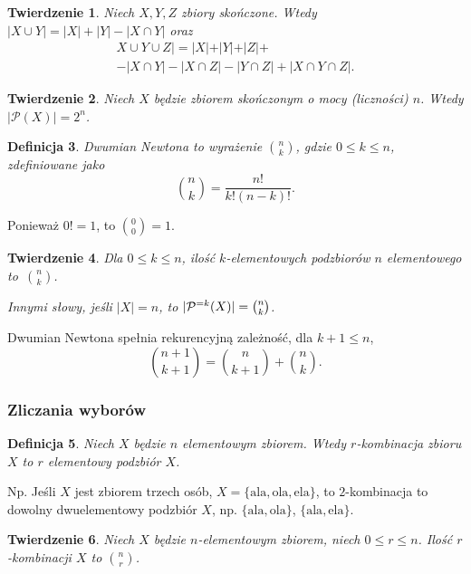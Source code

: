 \documentclass[12pt]{article}
\newcommand{\cP}{\mathcal{P}}
\newtheorem{thm}{Twierdzenie}
\newtheorem{dfn}[thm]{Definicja}
\newcommand{\ala}{\textrm{ala}}
\newcommand{\ela}{\textrm{ela}}
\newcommand{\ola}{\textrm{ola}}
\begin{document}
\begin{thm}
	Niech $X,Y, Z$ zbiory skończone. Wtedy 
		$|X\cup Y|=|X|+|Y|-|X\cap Y|$ oraz
		 \begin{multline*}
		 	X\cup Y\cup Z|= |X|+|Y|+|Z|+ \\
		 	- |X\cap Y| - |X\cap Z| - |Y\cap Z| + |X\cap Y\cap Z|.
		 \end{multline*} 
\end{thm}

\begin{thm}
	Niech $X$ będzie zbiorem skończonym o mocy (liczności) $n$. 
	Wtedy $|\cP(X)|=2^n$.
\end{thm}

\begin{dfn}
	Dwumian Newtona to wyrażenie $\binom{n}{k}$, gdzie $0\leq k\leq n$, zdefiniowane jako
	\[
	\binom{n}{k}=\frac{n!}{k!(n-k)!}.
	\]
\end{dfn}
Ponieważ $0!=1$, to $\binom{0}{0}=1$.

\begin{thm}
	Dla $0\leq k \leq n$, ilość $k$-elementowych podzbiorów
	$n$ elementowego to~$\binom{n}{k}$. 
	
	Innymi słowy, jeśli $|X|=n$, 
	to $|\cP\sp{=k}(X)|=\binom{n}{k}$.
\end{thm}

Dwumian Newtona spełnia rekurencyjną zależność,
dla $k+1\leq n$, 
\[
\binom{n+1}{k+1} = \binom{n}{k+1} + \binom{n}{k}.  
\]

\subsubsection{Zliczania wyborów}


\begin{dfn}
	Niech $X$ będzie $n$ elementowym zbiorem.
	Wtedy $r$-kombinacja  zbioru $X$ to $r$ elementowy podzbiór $X$.
\end{dfn} 

Np. Jeśli $X$ jest zbiorem trzech osób,
$X=\{\ala, \ola, \ela \}$, to $2$-kombinacja
to dowolny dwuelementowy podzbiór $X$, 
np. $\{\ala, \ola \}$, $\{\ala, \ela\}$.

\begin{thm}
	Niech $X$ będzie $n$-elementowym zbiorem, niech $0\leq r\leq n$. Ilość $r$-kombinacji $X$ to $\binom{n}{r}$.
\end{thm}
\end{document}
